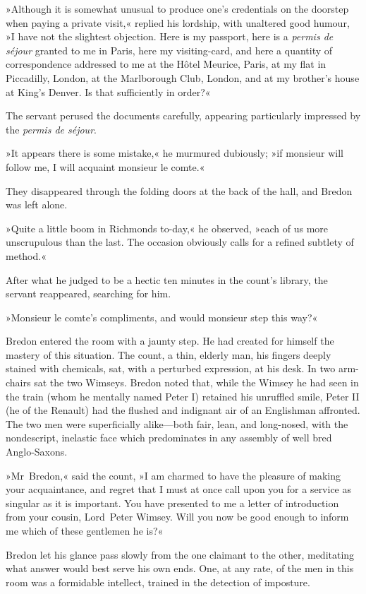 »Although it is somewhat unusual to produce one's credentials on the doorstep when paying a private visit,« replied his lordship, with unaltered good humour, »I have not the slightest objection. Here is my passport, here is a \textit{permis de séjour} granted to me in Paris, here my visiting-card, and here a quantity of correspondence addressed to me at the Hôtel Meurice, Paris, at my flat in Piccadilly, London, at the Marlborough Club, London, and at my brother's house at King's Denver. Is that sufficiently in order?«

The servant perused the documents carefully, appearing particularly impressed by the \textit{permis de séjour}.

»It appears there is some mistake,« he murmured dubiously; »if monsieur will follow me, I will acquaint monsieur le comte.«

They disappeared through the folding doors at the back of the hall, and Bredon was left alone.

»Quite a little boom in Richmonds to-day,« he observed, »each of us more unscrupulous than the last. The occasion obviously calls for a refined subtlety of method.«

After what he judged to be a hectic ten minutes in the count's library, the servant reappeared, searching for him.

»Monsieur le comte's compliments, and would monsieur step this way?«

Bredon entered the room with a jaunty step. He had created for himself the mastery of this situation. The count, a thin, elderly man, his fingers deeply stained with chemicals, sat, with a perturbed expression, at his desk. In two arm-chairs sat the two Wimseys. Bredon noted that, while the Wimsey he had seen in the train (whom he mentally named Peter I) retained his unruffled smile, Peter II (he of the Renault) had the flushed and indignant air of an Englishman affronted. The two men were superficially alike—both fair, lean, and long-nosed, with the nondescript, inelastic face which predominates in any assembly of well bred Anglo-Saxons.

»Mr~Bredon,« said the count, »I am charmed to have the pleasure of making your acquaintance, and regret that I must at once call upon you for a service as singular as it is important. You have presented to me a letter of introduction from your cousin, Lord~Peter Wimsey. Will you now be good enough to inform me which of these gentlemen he is?«

Bredon let his glance pass slowly from the one claimant to the other, meditating what answer would best serve his own ends. One, at any rate, of the men in this room was a formidable intellect, trained in the detection of imposture.

